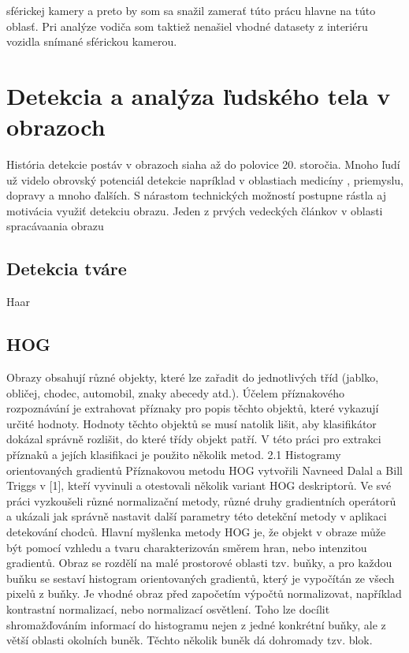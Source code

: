 \documentclass[slovak,master,dept460,male,cpp,cpdeclaration]{diploma}
\begin{document}
sférickej kamery a preto by som sa snažil zamerať túto prácu hlavne na túto oblasť. Pri analýze vodiča som taktiež nenašiel vhodné datasety z interiéru vozidla snímané sférickou kamerou.




\newpage
\section{Detekcia a analýza ľudského tela v obrazoch}
\label{sec:human body decection}

História detekcie postáv v obrazoch siaha až do polovice 20. storočia.  Mnoho ľudí už videlo obrovský potenciál detekcie napríklad v oblastiach medicíny , priemyslu, dopravy a mnoho ďalších. S nárastom technických možností postupne rástla aj motivácia využiť detekciu obrazu. Jeden z prvých vedeckých článkov v oblasti spracávaania obrazu \cite{rosenfeld1969}


\newpage
\subsection{Detekcia tváre}
Haar


\newpage
\subsection{HOG}
Obrazy obsahují různé objekty, které lze zařadit do jednotlivých tříd (jablko, obličej, chodec,
automobil, znaky abecedy atd.). Účelem příznakového rozpoznávání je extrahovat příznaky pro
popis těchto objektů, které vykazují určité hodnoty. Hodnoty těchto objektů se musí natolik lišit,
aby klasifikátor dokázal správně rozlišit, do které třídy objekt patří. V této práci pro extrakci
příznaků a jejích klasifikaci je použito několik metod.
2.1 Histogramy orientovaných gradientů
Příznakovou metodu HOG vytvořili Navneed Dalal a Bill Triggs v [1], kteří vyvinuli a otestovali
několik variant HOG deskriptorů. Ve své práci vyzkoušeli různé normalizační metody,
různé druhy gradientních operátorů a ukázali jak správně nastavit další parametry této detekční
metody v aplikaci detekování chodců.
Hlavní myšlenka metody HOG je, že objekt v obraze může být pomocí vzhledu a tvaru
charakterizován směrem hran, nebo intenzitou gradientů. Obraz se rozdělí na malé prostorové
oblasti tzv. buňky, a pro každou buňku se sestaví histogram orientovaných gradientů, který
je vypočítán ze všech pixelů z buňky. Je vhodné obraz před započetím výpočtů normalizovat,
například kontrastní normalizací, nebo normalizací osvětlení. Toho lze docílit shromažďováním
informací do histogramu nejen z jedné konkrétní buňky, ale z větší oblasti okolních buněk. Těchto
několik buněk dá dohromady tzv. blok.
\end{document}
